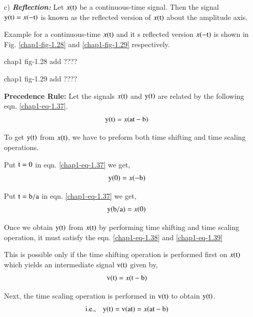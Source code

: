 \begin{itemize}
\item[{\rm c)}] {\it \bfseries Reflection:} Let $x(\textrm{t})$ be a continuous-time signal. Then the signal
${\textrm{y}}{(\textrm{t})} = x{(-\textrm{t})}$ is known as the reflected version of $x(\textrm{t})$ about the amplitude axis.

Example for a continuous-time $x(\textrm{t})$ and it s reflected version $x(-\textrm{t})$ is shown in Fig. \ref{chap1-fig-1.28} and \ref{chap1-fig-1.29} respectively.
\begin{center}
chap1  fig-1.28 add ????
\end{center}
\begin{center}
chap1  fig-1.29 add ????
\end{center}

{\bfseries Precedence Rule:} Let the signals $x(\textrm{t})$ and $\textrm{y}(\textrm{t})$ are related by the following
eqn. \ref{chap1-eq-1.37}.
\begin{equation}
{\textrm{y}}{(\textrm{t})}=x {(\textrm{a}\textrm{t}-\textrm{b})}\label{chap1-eq-1.37}
\end{equation}

To get $\textrm{y}(\textrm{t})$ from $x \rm(\textrm{t})$, we have to preform both time shifting and time scaling operations.

Put $\textrm{t}=0$ in eqn. \ref{chap1-eq-1.37} we get,
\begin{equation}
{\textrm{y}}(0)=x {(-\textrm{b})}\label{chap1-eq-1.38}
\end{equation}

Put $\textrm{t}=\textrm{b}/\textrm{a}$ in eqn. \ref{chap1-eq-1.37} we get,
\begin{equation}
{\textrm{y}}{(\textrm{b}/\textrm{a})}=x(0)\label{chap1-eq-1.39}
\end{equation}

Once we obtain ${\textrm{y}}{(\textrm{t})}$ from $x{(\textrm{t})}$ by performing time shifting and time scaling operation, it must satisfy the eqn. \ref{chap1-eq-1.38} and \ref{chap1-eq-1.39}

This is possible only if the time shifting operation is performed first on $x{(\textrm{t})}$ which yields an intermediate signal $\textrm{v}(\textrm{t})$ given by,
\begin{equation}
{\textrm{v}}{(\textrm{t})}=x{(\textrm{t}-\textrm{b})}\label{chap1-eq-1.40}
\end{equation}

Next, the time scaling operation is performed in $\textrm{v}(\textrm{t})$ to obtain $\textrm{y}(\textrm{t})$.
\begin{equation}
\text{i.e.,} \quad {\textrm{y}}{(\textrm{t})} = {\textrm{v}}{(\textrm{a}\textrm{t})} = x{(\textrm{a}\textrm{t}-\textrm{b})}\label{chap1-eq-1.41}
\end{equation}
\end{itemize}

